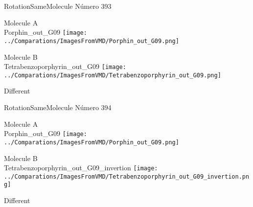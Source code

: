  \newpage

\vtab[-2cm]
\begin{center}
{\large RotationSameMolecule \tab Número 393}
\end{center}
\begin{multicols}{2}
\begin{center}
Molecule A \\ 
Porphin\_out\_G09
\texttt{[image: ../Comparations/ImagesFromVMD/Porphin\_out\_G09.png]}
\\
\vtab

\columnbreak
Molecule B \\ 
Tetrabenzoporphyrin\_out\_G09
\texttt{[image: ../Comparations/ImagesFromVMD/Tetrabenzoporphyrin\_out\_G09.png]}
\\
\vtab


\end{center}
\end{multicols}
\begin{center}
\vtab
\vtab
\textcolor{NavyBlue}{\Large Different}
\end{center}

 \newpage

\vtab[-2cm]
\begin{center}
{\large RotationSameMolecule \tab Número 394}
\end{center}
\begin{multicols}{2}
\begin{center}
Molecule A \\ 
Porphin\_out\_G09
\texttt{[image: ../Comparations/ImagesFromVMD/Porphin\_out\_G09.png]}
\\
\vtab

\columnbreak
Molecule B \\ 
Tetrabenzoporphyrin\_out\_G09\_invertion
\texttt{[image: ../Comparations/ImagesFromVMD/Tetrabenzoporphyrin\_out\_G09\_invertion.png]}
\\
\vtab


\end{center}
\end{multicols}
\begin{center}
\vtab
\vtab
\textcolor{NavyBlue}{\Large Different}
\end{center}

 \newpage

